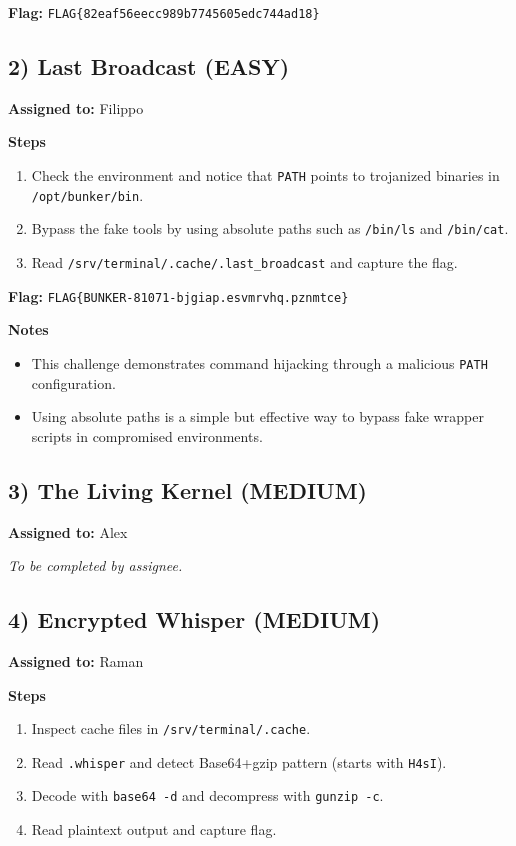 \documentclass[10pt,a4paper]{article}
\begin{document}
\textbf{Flag:} \texttt{FLAG\{82eaf56eecc989b7745605edc744ad18\}}

\subsection*{2) Last Broadcast (EASY)}
\textbf{Assigned to:} Filippo

\textbf{Steps}
\begin{enumerate}[leftmargin=*,noitemsep]
  \item Check the environment and notice that \texttt{PATH} points to trojanized binaries in \texttt{/opt/bunker/bin}.
  \item Bypass the fake tools by using absolute paths such as \texttt{/bin/ls} and \texttt{/bin/cat}.
  \item Read \texttt{/srv/terminal/.cache/.last\_broadcast} and capture the flag.
\end{enumerate}

\textbf{Flag:} \texttt{FLAG\{BUNKER-81071-bjgiap.esvmrvhq.pznmtce\}}

\textbf{Notes}
\begin{itemize}[leftmargin=*,noitemsep]
  \item This challenge demonstrates command hijacking through a malicious \texttt{PATH} configuration.
  \item Using absolute paths is a simple but effective way to bypass fake wrapper scripts in compromised environments.
\end{itemize}


\subsection*{3) The Living Kernel (MEDIUM)}
\textbf{Assigned to:} Alex

\textit{To be completed by assignee.}

\subsection*{4) Encrypted Whisper (MEDIUM)}
\textbf{Assigned to:} Raman

\textbf{Steps}
\begin{enumerate}[leftmargin=*,noitemsep]
  \item Inspect cache files in \texttt{/srv/terminal/.cache}.
  \item Read \texttt{.whisper} and detect Base64+gzip pattern (starts with \texttt{H4sI}).
  \item Decode with \texttt{base64 -d} and decompress with \texttt{gunzip -c}.
  \item Read plaintext output and capture flag.
\end{enumerate}
\end{document}
